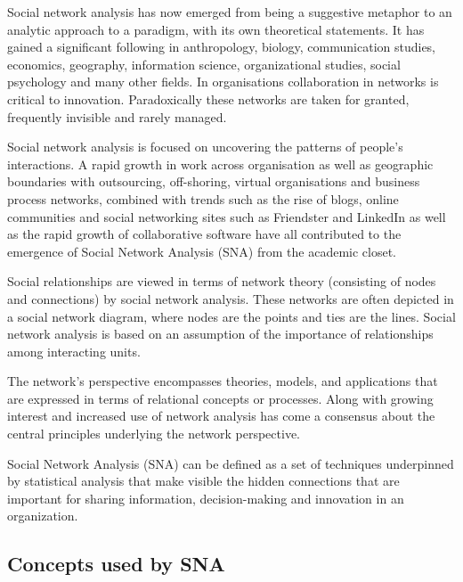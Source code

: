 Social network analysis has now emerged from being a suggestive metaphor to an analytic approach to a paradigm, with its own theoretical statements. It has gained a significant following in anthropology, biology, communication studies, economics, geography, information science, organizational studies, social psychology and many other fields. In organisations collaboration in networks is critical to innovation. Paradoxically these networks are taken for granted, frequently invisible and rarely managed.

Social network analysis is focused on uncovering the patterns of people’s interactions. A rapid growth in work across organisation as well as geographic boundaries with outsourcing, off-shoring, virtual organisations and business process networks, combined with trends such as the rise of blogs, online communities and social networking sites such as Friendster and LinkedIn as well as the rapid growth of collaborative software have all contributed to the emergence of Social Network Analysis (SNA) from the academic closet.

Social relationships are viewed in terms of network theory (consisting of nodes and connections) by social network analysis. These networks are often depicted in a social network diagram, where nodes are the points and ties are the lines. Social network analysis is based on an assumption of the importance of relationships among interacting units.

The network’s perspective encompasses theories, models, and applications that are expressed in terms of relational concepts or processes. Along with growing interest and increased use of network analysis has come a consensus about the central principles underlying the network perspective.

Social Network Analysis (SNA) can be defined as a set of techniques underpinned by statistical analysis that make visible the hidden connections that are important for sharing information, decision-making and innovation in an organization.

\subsection{Concepts used by SNA}

